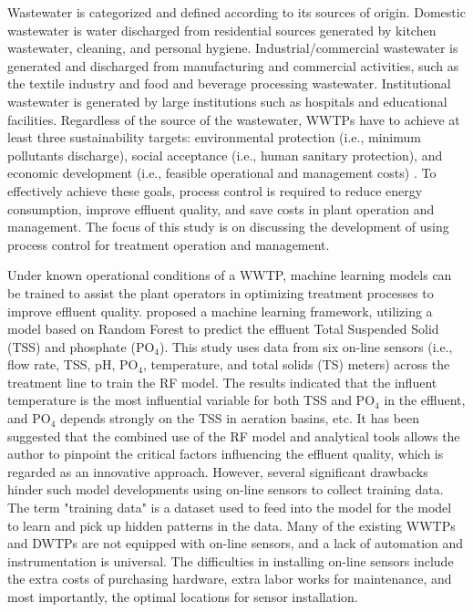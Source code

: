 Wastewater is categorized and defined according to its sources of origin. Domestic wastewater is water discharged from residential sources generated by kitchen wastewater, cleaning, and personal hygiene. Industrial/commercial wastewater is generated and discharged from manufacturing and commercial activities, such as the textile industry and food and beverage processing wastewater. Institutional wastewater is generated by large institutions such as hospitals and educational facilities. Regardless of the source of the wastewater, WWTPs have to achieve at least three sustainability targets: environmental protection (i.e., minimum pollutants discharge), social acceptance (i.e., human sanitary protection), and economic development (i.e., feasible operational and management costs) \citep{manninaDecisionSupportSystems2019}. To effectively achieve these goals, process control is required to reduce energy consumption, improve effluent quality, and save costs in plant operation and management. The focus of this study is on discussing the development of using process control for treatment operation and management.

Under known operational conditions of a WWTP, machine learning models can be trained to assist the plant operators in optimizing treatment processes to improve effluent quality. \citet{wangMachineLearningFramework2021} proposed a machine learning framework, utilizing a model based on Random Forest to predict the effluent Total Suspended Solid (TSS) and phosphate (PO$_4$). This study uses data from six on-line sensors (i.e., flow rate, TSS, pH, PO$_4$, temperature, and total solids (TS) meters) across the treatment line to train the RF model. The results indicated that the influent temperature is the most influential variable for both TSS and PO$_4$ in the effluent, and PO$_4$ depends strongly on the TSS in aeration basins, etc. It has been suggested that the combined use of the RF model and analytical tools allows the author to pinpoint the critical factors influencing the effluent quality, which is regarded as an innovative approach. However, several significant drawbacks hinder such model developments using on-line sensors to collect training data. The term "training data" is a dataset used to feed into the model for the model to learn and pick up hidden patterns in the data. Many of the existing WWTPs and DWTPs are not equipped with on-line sensors, and a lack of automation and instrumentation is universal. The difficulties in installing on-line sensors include the extra costs of purchasing hardware, extra labor works for maintenance, and most importantly, the optimal locations for sensor installation. 

